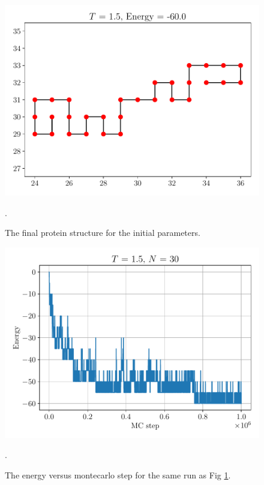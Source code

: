 \documentclass{article}
\begin{document}
\begin{figure}[h!]
    \centerline{\includegraphics[scale=0.6]{images/Q3b_final_protein_T15_N30_n1000000.pdf}}
    \caption{The final protein structure for the initial parameters. }.
    \label{fig:q3b_protein15}
\end{figure}
\begin{figure}[h!]
    \centerline{\includegraphics[scale=0.6]{images/Q3b_energy_vs_step_T15_N30_n1000000.pdf}}
    \caption{The energy versus montecarlo step for the same run as Fig \ref{fig:q3b_protein15}. }.
    \label{fig:q3b_energy15}
\end{figure}
\end{document}
